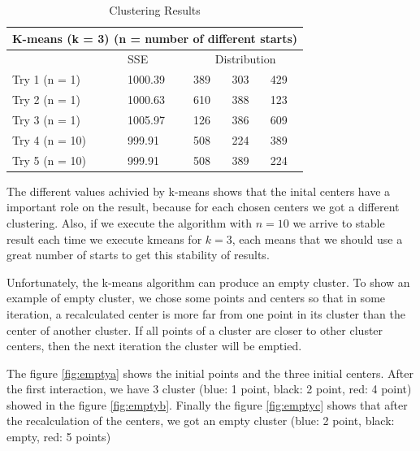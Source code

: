 \documentclass[a4paper,11pt]{article}
\begin{document}
\begin{table}[H]
  \caption{Clustering Results}
  \label{tab:kmens3}

  \begin{center}
    \begin{tabular}{|l|l|l|l|l|}
      \hline
      \multicolumn{5}{|c|}{K-means (k = 3) (n = number of different starts)}\\
      \hline
      & SSE & \multicolumn{3}{|c|}{Distribution}\\
      \hline
      Try 1 (n = 1) & 1000.39 & 389 & 303 & 429 \\
      Try 2 (n = 1) & 1000.63 & 610 & 388 & 123\\
      Try 3 (n = 1) & 1005.97 & 126 & 386 & 609\\
      Try 4 (n = 10) & 999.91 & 508& 224 & 389\\
      Try 5 (n = 10) & 999.91 & 508& 389 & 224\\
      \hline
    \end{tabular}
  \end{center}
\end{table}


The different  values achivied by k-means  shows that the inital  centers have a
important role on the result, because for each chosen centers we got a different
clustering. Also, if we execute the algorithm  with $n = 10$ we arrive to stable
result each time  we execute kmeans for  $k=3$, each means that we  should use a
great number of starts to get this stability of results.

Unfortunately, the k-means algorithm can produce an empty cluster.
To show an example  of empty cluster, we chose some  points and centers so
that in some iteration,  a recalculated center is more far from  one point in its
cluster than the center of another cluster. 
If all points of a cluster are closer to other cluster centers, then the next iteration the cluster will be emptied.

The figure \ref{fig:emptya} shows the initial points and the three initial centers. After the 
first interaction, we have 3 cluster (blue: 1 point, black: 2 point, red: 4
point) showed in the figure \ref{fig:emptyb}. Finally the figure \ref{fig:emptyc}
shows that after the recalculation of the
centers, we got an empty cluster (blue: 2 point, black: empty, red: 5 points)
\end{document}
